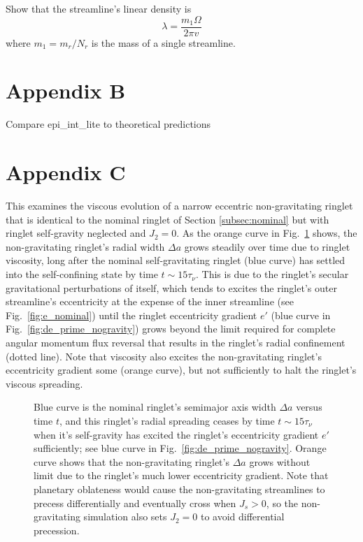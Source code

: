 \documentclass[preprint]{aastex62}
\begin{document}
Show that the streamline's linear density is
\begin{equation}
    \label{eqn:lambda}
    \lambda = \frac{m_1\Omega}{2\pi v}
\end{equation}
where $m_1 = m_r/N_r$ is the mass of a single streamline.

\section{Appendix B}
\label{sec:Appendix B}

Compare epi\_int\_lite to theoretical predictions

\section{Appendix C}
\label{sec:Appendix C}

This examines the viscous evolution of a narrow eccentric non-gravitating
ringlet that is identical to the nominal ringlet of Section \ref{subsec:nominal} but
with ringlet self-gravity neglected and $J_2=0$.
As the orange curve in Fig.\ \ref{fig:da_nogravity} shows, the non-gravitating ringlet's
radial width $\Delta a$ grows steadily over time due to ringlet viscosity, 
long after the nominal self-gravitating ringlet (blue curve)
has settled into the self-confining state by time $t\sim15\tau_\nu$. This is due to the
ringlet's secular gravitational perturbations of itself,
which tends to excites the ringlet's outer streamline's eccentricity at the expense
of the inner streamline (see Fig.\ \ref{fig:e_nominal}) until the ringlet eccentricity gradient $e'$
(blue curve in Fig.\ \ref{fig:de_prime_nogravity}) grows beyond the
limit required for complete angular momentum flux reversal 
that results in the ringlet's radial confinement (dotted line). 
Note that viscosity also excites the non-gravitating
ringlet's eccentricity gradient some (orange curve), but not sufficiently to halt the ringlet's 
viscous spreading.

\begin{figure}
    \caption{
        \label{fig:da_nogravity}
        Blue curve is the nominal ringlet's semimajor axis width $\Delta a$ versus time $t$,
        and this ringlet's radial spreading ceases by time $t\sim15\tau_\nu$ when it's self-gravity
        has excited the ringlet's eccentricity gradient $e'$ sufficiently; 
        see blue curve in Fig.\ \ref{fig:de_prime_nogravity}. Orange curve shows that
        the non-gravitating ringlet's $\Delta a$ grows without limit due to the ringlet's
        much lower eccentricity gradient. Note that planetary oblateness would
        cause the non-gravitating streamlines to precess differentially and eventually cross
        when $J_s>0$, so the non-gravitating simulation also sets $J_2=0$ 
        to avoid differential precession.
    }
\end{figure}
\end{document}
